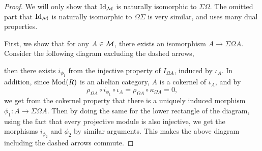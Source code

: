\begin{proof}
    We will only show that \( \operatorname{Id}_{{\mathcal{M}}} \) is naturally isomorphic to \( \Sigma \Omega \). The omitted part that \( \operatorname{Id}_{{\mathcal{M}}} \) is naturally isomorphic to \( \Omega \Sigma \) is very similar, and uses many dual properties.

    First, we show that for any \( A \in {\mathcal{M}} \), there exists an isomorphism \( A \to \Sigma \Omega A \). Consider the following diagram excluding the dashed arrows,
    \begin{center}
    \end{center}
    then there exists \( i_{\phi_1} \) from the injective property of \( I_{\Omega A} \), induced by \( \iota_A \). In addition, since \( \operatorname{Mod}(R) \) is an abelian category, \( A \) is a cokernel of \( \iota_A \), and by
    \[
        \rho_{\Omega A} \circ i_{\phi_1} \circ \iota_A = \rho_{\Omega A} \circ \kappa_{\Omega A} = 0,
    \]
    we get from the cokernel property that there is a uniquely induced morphism \( \phi_1: A \to \Sigma\Omega A \). Then by doing the same for the lower rectangle of the diagram, using the fact that every projective module is also injective, we get the morphisms \( i_{\phi_2} \) and \( \phi_2 \) by similar arguments. This makes the above diagram including the dashed arrows commute.


\end{proof}
